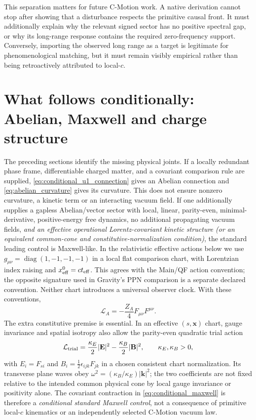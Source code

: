 \documentclass[11pt]{article}
\theoremstyle{definition}
\newcommand{\Lag}{\mathcal{L}}
\begin{document}
This separation matters for future C-Motion work.  A native derivation cannot stop after showing that a disturbance respects the primitive causal front.  It must additionally explain why the relevant signed sector has no positive spectral gap, or why its long-range response contains the required zero-frequency support.  Conversely, importing the observed long range as a target is legitimate for phenomenological matching, but it must remain visibly empirical rather than being retroactively attributed to local-$c$.

\section{What follows conditionally: Abelian, Maxwell and charge structure}
\label{sec:abelian_controls}

The preceding sections identify the missing physical joints.  If a locally redundant phase frame, differentiable charged matter, and a covariant comparison rule are supplied, \cref{eq:conditional_u1_connection} gives an Abelian connection and \cref{eq:abelian_curvature} gives its curvature.  This does not ensure nonzero curvature, a kinetic term or an interacting vacuum field.  If one additionally supplies a gapless Abelian/vector sector with local, linear, parity-even, minimal-derivative, positive-energy free dynamics, no additional propagating vacuum fields, \emph{and an effective operational Lorentz-covariant kinetic structure (or an equivalent common-cone and constitutive-normalization condition)}, the standard leading control is Maxwell-like.  In the relativistic
effective actions below we use $g_{\mu\nu}=\operatorname{diag}(1,-1,-1,-1)$
in a local flat comparison chart, with Lorentzian index raising and
$x^0_{\rm eff}=ct_{\rm eff}$.  This agrees with the Main/QF action convention;
the opposite signature used in Gravity's PPN comparison is a separate declared
convention.  Neither chart introduces a universal observer clock.
With these conventions,
\begin{equation}
 \Lag_A=-\frac{Z_A}{4}F_{\mu\nu}F^{\mu\nu}.
 \label{eq:conditional_maxwell}
\end{equation}
The extra constitutive premise is essential.  In an effective $(s,\mathbf x)$
chart, gauge invariance and spatial isotropy also allow the parity-even quadratic
trial action
\begin{equation}
 \mathcal L_{\rm trial}=
 \frac{\kappa_E}{2}|\mathbf E|^2-
 \frac{\kappa_B}{2}|\mathbf B|^2,\qquad
 \kappa_E,\kappa_B>0,
 \label{eq:nonlorentz_gauge_trial}
\end{equation}
with $E_i=F_{si}$ and $B_i=\tfrac12\epsilon_{ijk}F_{jk}$ in a chosen
consistent chart normalization.  Its transverse plane waves obey
$\omega^2=(\kappa_B/\kappa_E)|\mathbf k|^2$; the two coefficients are not fixed
relative to the intended common physical cone by local gauge invariance or
positivity alone.  The covariant contraction in
\cref{eq:conditional_maxwell} is therefore a \emph{conditional standard
Maxwell control}, not a consequence of primitive local-$c$ kinematics or
an independently selected C-Motion vacuum law.
\end{document}
